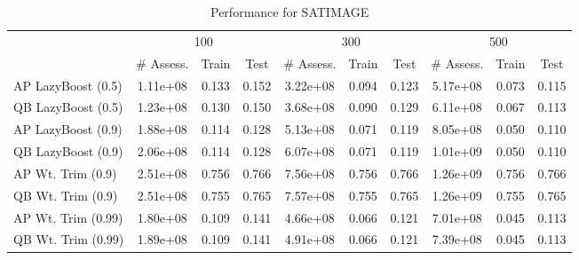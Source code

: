 \begin{table*}[ht]
\caption{Performance for SATIMAGE}
\label{tbl:perf-satimage}
\vskip 0.15in
\begin{center}
\begin{small}
\begin{sc}
\begin{tabular}{lccccccccc}
\toprule
	& \multicolumn{3}{c}{100}
	& \multicolumn{3}{c}{300}
	& \multicolumn{3}{c}{500}
	\\
 & \# Assess. & Train & Test & \# Assess. & Train & Test & \# Assess. & Train & Test \\
\midrule
AP LazyBoost (0.5) & 1.11e+08 & 0.133 & 0.152 & 3.22e+08 & 0.094 & 0.123 & 5.17e+08 & 0.073 & 0.115 \\
QB LazyBoost (0.5) & 1.23e+08 & 0.130 & 0.150 & 3.68e+08 & 0.090 & 0.129 & 6.11e+08 & 0.067 & 0.113 \\
AP LazyBoost (0.9) & 1.88e+08 & 0.114 & 0.128 & 5.13e+08 & 0.071 & 0.119 & 8.05e+08 & 0.050 & 0.110 \\
QB LazyBoost (0.9) & 2.06e+08 & 0.114 & 0.128 & 6.07e+08 & 0.071 & 0.119 & 1.01e+09 & 0.050 & 0.110 \\
AP Wt. Trim (0.9) & 2.51e+08 & 0.756 & 0.766 & 7.56e+08 & 0.756 & 0.766 & 1.26e+09 & 0.756 & 0.766 \\
QB Wt. Trim (0.9) & 2.51e+08 & 0.755 & 0.765 & 7.57e+08 & 0.755 & 0.765 & 1.26e+09 & 0.755 & 0.765 \\
AP Wt. Trim (0.99) & 1.80e+08 & 0.109 & 0.141 & 4.66e+08 & 0.066 & 0.121 & 7.01e+08 & 0.045 & 0.113 \\
QB Wt. Trim (0.99) & 1.89e+08 & 0.109 & 0.141 & 4.91e+08 & 0.066 & 0.121 & 7.39e+08 & 0.045 & 0.113 \\
\bottomrule
\end{tabular}
\end{sc}
\end{small}
\end{center}
\vskip -0.1in
\end{table*}
